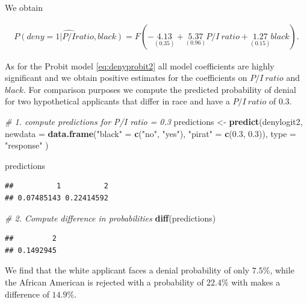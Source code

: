 \documentclass[]{book}
\newenvironment{Shaded}{\begin{snugshade}}{\end{snugshade}}
\newcommand{\KeywordTok}[1]{\textcolor[rgb]{0.13,0.29,0.53}{\textbf{#1}}}
\newcommand{\DataTypeTok}[1]{\textcolor[rgb]{0.13,0.29,0.53}{#1}}
\newcommand{\FloatTok}[1]{\textcolor[rgb]{0.00,0.00,0.81}{#1}}
\newcommand{\StringTok}[1]{\textcolor[rgb]{0.31,0.60,0.02}{#1}}
\newcommand{\CommentTok}[1]{\textcolor[rgb]{0.56,0.35,0.01}{\textit{#1}}}
\newcommand{\NormalTok}[1]{#1}
\theoremstyle{definition}
\theoremstyle{definition}
\theoremstyle{definition}
\theoremstyle{remark}
\begin{document}
We obtain

\begin{align}
  \widehat{P(deny=1 \vert P/I ratio, black)} = F(-\underset{(0.35)}{4.13} + \underset{(0.96)}{5.37} P/I \ ratio + \underset{(0.15)}{1.27} black). \label{eq:denylogit2}
\end{align}

As for the Probit model \eqref{eq:denyprobit2} all model coefficients are
highly significant and we obtain positive estimates for the coefficients
on \(P/I \ ratio\) and \(black\). For comparison purposes we compute the
predicted probability of denial for two hypothetical applicants that
differ in race and have a \(P/I \ ratio\) of \(0.3\).

\begin{Shaded}
\begin{Highlighting}[]
\CommentTok{# 1. compute predictions for P/I ratio = 0.3}
\NormalTok{predictions <-}\StringTok{ }\KeywordTok{predict}\NormalTok{(denylogit2, }
                       \DataTypeTok{newdata =} \KeywordTok{data.frame}\NormalTok{(}\StringTok{"black"}\NormalTok{ =}\StringTok{ }\KeywordTok{c}\NormalTok{(}\StringTok{"no"}\NormalTok{, }\StringTok{"yes"}\NormalTok{), }
                                            \StringTok{"pirat"}\NormalTok{ =}\StringTok{ }\KeywordTok{c}\NormalTok{(}\FloatTok{0.3}\NormalTok{, }\FloatTok{0.3}\NormalTok{)),}
                       \DataTypeTok{type =} \StringTok{"response"}
\NormalTok{                      )}

\NormalTok{predictions}
\end{Highlighting}
\end{Shaded}

\begin{verbatim}
##          1          2 
## 0.07485143 0.22414592
\end{verbatim}

\begin{Shaded}
\begin{Highlighting}[]
\CommentTok{# 2. Compute difference in probabilities}
\KeywordTok{diff}\NormalTok{(predictions)}
\end{Highlighting}
\end{Shaded}

\begin{verbatim}
##         2 
## 0.1492945
\end{verbatim}

We find that the white applicant faces a denial probability of only
\(7.5\%\), while the African American is rejected with a probability of
\(22.4\%\) with makes a difference of \(14.9\%\).
\end{document}
